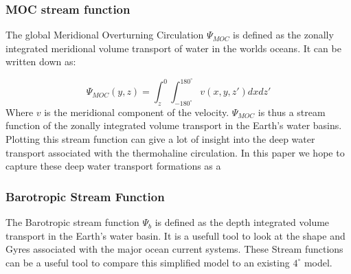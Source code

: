  \subsubsection{MOC stream function} \label{sec:MOCSTREAM}
 
 The global Meridional Overturning Circulation $\Psi_{MOC}$ is defined as the zonally integrated meridional volume transport of water in the worlds oceans. It can be written down as:
 
 $$
 \Psi_{MOC}(y,z) = \int_{z}^{0} \int_{-180^{\circ}}^{180^{\circ}} v(x,y,z') dx dz'
 $$
Where $v$ is the meridional component of the velocity.
$ \Psi_{MOC}$ is thus a stream function of the zonally integrated volume transport in the Earth's water basins. Plotting this stream function can give a lot of insight into the deep water transport associated with the thermohaline circulation. In this paper we hope to capture these deep water transport formations as a 

\subsubsection{Barotropic Stream Function}

The Barotropic stream function $\Psi_{b}$ is defined as the depth integrated volume transport in the Earth's water basin. It is a usefull tool to look at the shape and Gyres associated with the major ocean current systems. These Stream functions can be a useful tool to compare this simplified model to an existing $4^{\circ}$ model.

